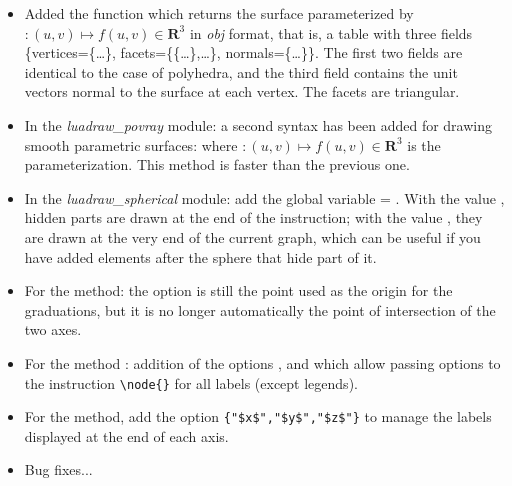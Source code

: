\begin{itemize}
    \item Added the function  which returns the surface parameterized by $\colon(u,v)\mapsto f(u,v)\in\mathbf R^3$ in \emph{obj} format, that is, a table with three fields \{vertices=\{\ldots\}, facets=\{\{\ldots\},\ldots\}, normals=\{\ldots\}\}. The first two fields are identical to the case of polyhedra, and the third field contains the unit vectors normal to the surface at each vertex. The facets are triangular.

    \item In the \emph{luadraw\_povray} module: a second syntax has been added for drawing smooth parametric surfaces:
    where $\colon(u,v)\mapsto f(u,v)\in\mathbf R^3$ is the parameterization. This method is faster than the previous one.

    \item In the \emph{luadraw\_spherical} module: add the global variable  = \false. With the value \false, hidden parts are drawn at the end of the  instruction; with the value \true, they are drawn at the very end of the current graph, which can be useful if you have added elements after the sphere that hide part of it.

    \item For the  method: the  option is still the point used as the origin for the graduations, but it is no longer automatically the point of intersection of the two axes.

    \item For the method : addition of the options ,  and  which allow passing options to the instruction \verb|\node{}| for all labels (except legends).
    
    \item For the  method, add the option \verb|{"$x$","$y$","$z$"}| to manage the labels displayed at the end of each axis.

    \item Bug fixes...
\end{itemize}

